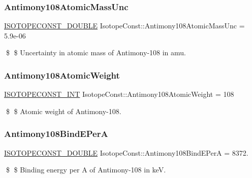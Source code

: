 \subsubsection{\texorpdfstring{Antimony108\+Atomic\+Mass\+Unc}{Antimony108AtomicMassUnc}}
{\footnotesize\ttfamily \mbox{\hyperlink{group___isotope_const-_macros_ga8f45a7272ce02c0b4c65c44636ed719a}{I\+S\+O\+T\+O\+P\+E\+C\+O\+N\+S\+T\+\_\+\+D\+O\+U\+B\+LE}} Isotope\+Const\+::\+Antimony108\+Atomic\+Mass\+Unc = 5.\+9e-\/06}

\$ \$ Uncertainty in atomic mass of Antimony-\/108 in amu. \mbox{\label{group___isotope_const-_antimony-_sb108_ga7abe879f6243cf2b1c17f16a854358e8}} 
\subsubsection{\texorpdfstring{Antimony108\+Atomic\+Weight}{Antimony108AtomicWeight}}
{\footnotesize\ttfamily \mbox{\hyperlink{group___isotope_const-_macros_ga5f18360b3e99483a35c32d789e62621c}{I\+S\+O\+T\+O\+P\+E\+C\+O\+N\+S\+T\+\_\+\+I\+NT}} Isotope\+Const\+::\+Antimony108\+Atomic\+Weight = 108}

\$ \$ Atomic weight of Antimony-\/108. \mbox{\label{group___isotope_const-_antimony-_sb108_ga83cd1e8d6ba8d4bbb1de9046f9a933c7}} 
\subsubsection{\texorpdfstring{Antimony108\+Bind\+E\+PerA}{Antimony108BindEPerA}}
{\footnotesize\ttfamily \mbox{\hyperlink{group___isotope_const-_macros_ga8f45a7272ce02c0b4c65c44636ed719a}{I\+S\+O\+T\+O\+P\+E\+C\+O\+N\+S\+T\+\_\+\+D\+O\+U\+B\+LE}} Isotope\+Const\+::\+Antimony108\+Bind\+E\+PerA = 8372.}

\$ \$ Binding energy per A of Antimony-\/108 in keV. \mbox{\label{group___isotope_const-_antimony-_sb108_ga07ef70b8621ca6c677b98288999ae81f}} 
